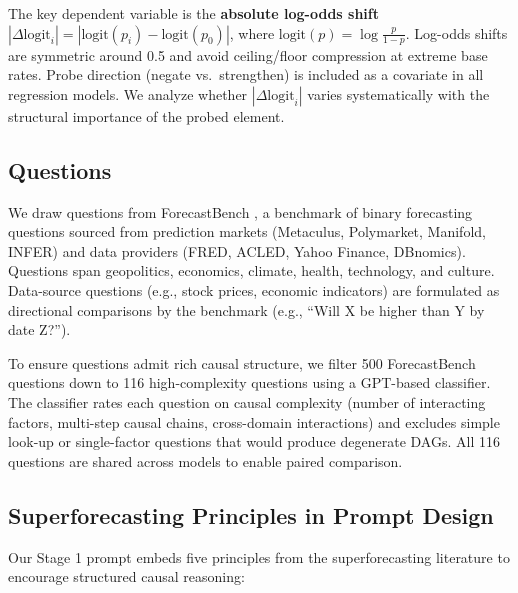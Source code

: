 \documentclass[11pt]{article}
\begin{document}
The key dependent variable is the \textbf{absolute log-odds shift} $|\Delta\text{logit}_i| = |\text{logit}(p_i) - \text{logit}(p_0)|$, where $\text{logit}(p) = \log\frac{p}{1-p}$. Log-odds shifts are symmetric around 0.5 and avoid ceiling/floor compression at extreme base rates. Probe direction (negate vs.\ strengthen) is included as a covariate in all regression models. We analyze whether $|\Delta\text{logit}_i|$ varies systematically with the structural importance of the probed element.

\subsection{Questions}

We draw questions from ForecastBench \cite{zou2024forecastbench}, a benchmark of binary forecasting questions sourced from prediction markets (Metaculus, Polymarket, Manifold, INFER) and data providers (FRED, ACLED, Yahoo Finance, DBnomics). Questions span geopolitics, economics, climate, health, technology, and culture. Data-source questions (e.g., stock prices, economic indicators) are formulated as directional comparisons by the benchmark (e.g., ``Will X be higher than Y by date Z?'').

To ensure questions admit rich causal structure, we filter 500 ForecastBench questions down to 116 high-complexity questions using a GPT-based classifier. The classifier rates each question on causal complexity (number of interacting factors, multi-step causal chains, cross-domain interactions) and excludes simple look-up or single-factor questions that would produce degenerate DAGs. All 116 questions are shared across models to enable paired comparison.

\subsection{Superforecasting Principles in Prompt Design}
\label{sec:superforecasting}

Our Stage 1 prompt embeds five principles from the superforecasting literature \cite{tetlock2015superforecasting} to encourage structured causal reasoning:
\end{document}
